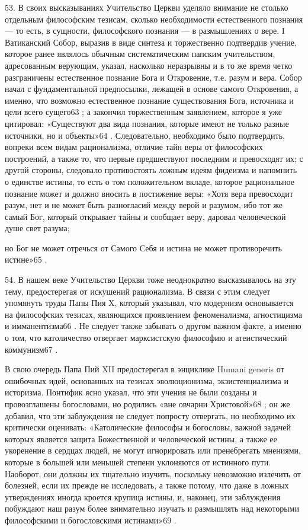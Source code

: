 \documentclass[a5paper,10pt]{article}
\begin{document}
53. В своих высказываниях Учительство Церкви уделяло внимание не столько
отдельным философским тезисам, сколько необходимости естественного познания —
то есть, в сущности, философского познания — в размышлениях о вере. I
Ватиканский Собор, выразив в виде синтеза и торжественно подтвердив учение,
которое ранее являлось обычным систематическим папским учительством,
адресованным верующим, указал, насколько неразрывны и в то же время четко
разграничены естественное познание Бога и Откровение, т.е. разум и вера. Собор
начал с фундаментальной предпосылки, лежащей в основе самого Откровения, а
именно, что возможно естественное познание существования Бога, источника и цели
всего сущего63 ; а закончил торжественным заявлением, которое я уже цитировал:
«Существуют два вида познания, которые имеют не только разные источники, но и
объекты»64 . Следовательно, необходимо было подтвердить, вопреки всем видам
рационализма, отличие тайн веры от философских построений, а также то, что
первые предшествуют последним и превосходят их; с другой стороны, следовало
противостоять ложным идеям фидеизма и напомнить о единстве истины, то есть о
том положительном вкладе, которое рациональное познание может и должно вносить
в постижение веры: «Хотя вера превосходит разум, нет и не может быть
разногласий между верой и разумом, ибо тот же самый Бог, который открывает
тайны и сообщает веру, даровал человеческой душе свет разума;

но Бог не может отречься от Самого Себя и истина не может противоречить
истине»65 .

54. В нашем веке Учительство Церкви тоже неоднократно высказывалось на эту
тему, предостерегая от искушений рационализма. В связи с этим следует упомянуть
труды Папы Пия X, который указывал, что модернизм основывается на философских
тезисах, являющихся проявлением феноменализма, агностицизма и имманентизма66 .
Не следует также забывать о другом важном факте, а именно о том, что
католичество отвергает марксистскую философию и атеистический коммунизм67 .

В свою очередь Папа Пий XII предостерегал в энциклике Humani generis от
ошибочных идей, основанных на тезисах эволюционизма, экзистенциализма и
историзма. Понтифик ясно указал, что эти учения не были созданы и провозглашены
богословами, но родились «вне овчарни Христовой»68 ; он же добавил, что эти
заблуждения не следует попросту отвергать, но необходимо их критически
оценивать: «Католические философы и богословы, важной задачей которых является
защита Божественной и человеческой истины, а также ее укоренение в сердцах
людей, не могут игнорировать или пренебрегать мнениями, которые в большей или
меньшей степени уклоняются от истинного пути. Наоборот, они должны их тщательно
изучить, поскольку невозможно излечить от болезней, если их прежде не
исследовать, а также потому, что даже в ложных утверждениях иногда кроется
крупица истины, и, наконец, эти заблуждения побуждают наш разум более
внимательно изучать и размышлять над некоторыми философскими и богословскими
истинами»69 .
\end{document}
